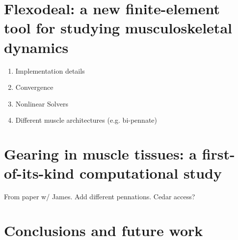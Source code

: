 \documentclass{sfuthesis}
\numberwithin{equation}{chapter}
\numberwithin{figure}{chapter}
\numberwithin{table}{chapter}
\theoremstyle{definition}
\begin{document}
\chapter{Flexodeal: a new finite-element tool for studying musculoskeletal dynamics}

\begin{enumerate}
    \item Implementation details
    \item Convergence
    \item Nonlinear Solvers
    \item Different muscle architectures (e.g. bi-pennate)
\end{enumerate}

\chapter{Gearing in muscle tissues: a first-of-its-kind computational study}

From paper w/ James. Add different pennations. Cedar access?



\chapter{Conclusions and future work}


%
%
%
%
%

\backmatter%
    
    
\end{document}
